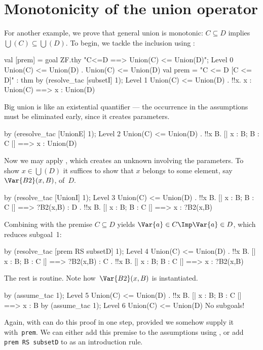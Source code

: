 \section{Monotonicity of the union operator}
For another example, we prove that general union is monotonic:
${C\subseteq D}$ implies $\bigcup(C)\subseteq \bigcup(D)$.  To begin, we
tackle the inclusion using :
\begin{ttbox}
val [prem] = goal ZF.thy "C<=D ==> Union(C) <= Union(D)";
{\out Level 0}
{\out Union(C) <= Union(D)}
{. Union(C) <= Union(D)}
{\out val prem = "C <= D  [C <= D]" : thm}
\ttbreak
by (resolve_tac [subsetI] 1);
{\out Level 1}
{\out Union(C) <= Union(D)}
{. !!x. x : Union(C) ==> x : Union(D)}
\end{ttbox}
Big union is like an existential quantifier --- the occurrence in the
assumptions must be eliminated early, since it creates parameters.
\begin{ttbox}
by (eresolve_tac [UnionE] 1);
{\out Level 2}
{\out Union(C) <= Union(D)}
{. !!x B. [| x : B; B : C |] ==> x : Union(D)}
\end{ttbox}
Now we may apply , which creates an unknown involving the
parameters.  To show $x\in \bigcup(D)$ it suffices to show that $x$ belongs
to some element, say~$\Var{B2}(x,B)$, of~$D$.
\begin{ttbox}
by (resolve_tac [UnionI] 1);
{\out Level 3}
{\out Union(C) <= Union(D)}
{. !!x B. [| x : B; B : C |] ==> ?B2(x,B) : D}
{. !!x B. [| x : B; B : C |] ==> x : ?B2(x,B)}
\end{ttbox}
Combining  with the premise $C\subseteq D$ yields 
$\Var{a}\in C \Imp \Var{a}\in D$, which reduces subgoal~1:
\begin{ttbox}
by (resolve_tac [prem RS subsetD] 1);
{\out Level 4}
{\out Union(C) <= Union(D)}
{. !!x B. [| x : B; B : C |] ==> ?B2(x,B) : C}
{. !!x B. [| x : B; B : C |] ==> x : ?B2(x,B)}
\end{ttbox}
The rest is routine.  Note how~$\Var{B2}(x,B)$ is instantiated.
\begin{ttbox}
by (assume_tac 1);
{\out Level 5}
{\out Union(C) <= Union(D)}
{. !!x B. [| x : B; B : C |] ==> x : B}
by (assume_tac 1);
{\out Level 6}
{\out Union(C) <= Union(D)}
{\out No subgoals!}
\end{ttbox}
Again,  with  can do this proof in one
step, provided we somehow supply it with~{\tt prem}.  We can either add
this premise to the assumptions using , or add
\hbox{\tt prem RS subsetD} to  as an introduction rule.

